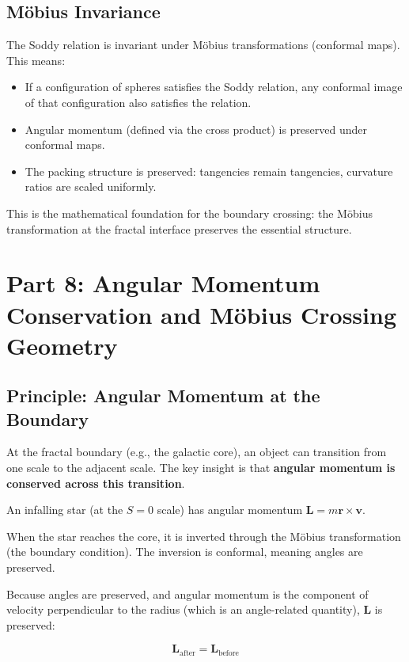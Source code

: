 \documentclass[11pt,a4paper]{article}
\begin{document}
\subsection{Möbius Invariance}

The Soddy relation is invariant under Möbius transformations (conformal maps). This means:

\begin{itemize}
\item If a configuration of spheres satisfies the Soddy relation, any conformal image of that configuration also satisfies the relation.
\item Angular momentum (defined via the cross product) is preserved under conformal maps.
\item The packing structure is preserved: tangencies remain tangencies, curvature ratios are scaled uniformly.
\end{itemize}

This is the mathematical foundation for the boundary crossing: the Möbius transformation at the fractal interface preserves the essential structure.


\section{Part 8: Angular Momentum Conservation and Möbius Crossing Geometry}

\subsection{Principle: Angular Momentum at the Boundary}

At the fractal boundary (e.g., the galactic core), an object can transition from one scale to the adjacent scale. The key insight is that \textbf{angular momentum is conserved across this transition}.

An infalling star (at the $S=0$ scale) has angular momentum $\mathbf{L} = m\mathbf{r} \times \mathbf{v}$.

When the star reaches the core, it is inverted through the Möbius transformation (the boundary condition). The inversion is conformal, meaning angles are preserved.

Because angles are preserved, and angular momentum is the component of velocity perpendicular to the radius (which is an angle-related quantity), $\mathbf{L}$ is preserved:

\[
\mathbf{L}_{\text{after}} = \mathbf{L}_{\text{before}}
\]
\end{document}
